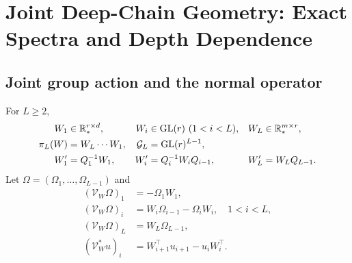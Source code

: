 \section{Joint Deep-Chain Geometry: Exact Spectra and Depth Dependence}
\label{app:rigid-chain}
\subsection{Joint group action and the normal operator}
\begin{definition}
For $L\geq2$,
\begin{align}
W_1&\in\mathbb R_*^{r\times d},&
W_i&\in{\rm GL}(r)\ (1<i<L),&
W_L&\in\mathbb R_*^{m\times r},\\
\pi_L(W)&=W_L\cdots W_1,&
\mathcal G_L&={\rm GL}(r)^{L-1},\\
W_1'&=Q_1^{-1}W_1,&
W_i'&=Q_i^{-1}W_iQ_{i-1},&
W_L'&=W_LQ_{L-1}.
\end{align}
Let $\Omega=(\Omega_1,\ldots,\Omega_{L-1})$ and
\begin{align}
(\mathcal V_W\Omega)_1&=-\Omega_1W_1,\\
(\mathcal V_W\Omega)_i&=W_i\Omega_{i-1}-\Omega_iW_i,\quad1<i<L,\\
(\mathcal V_W\Omega)_L&=W_L\Omega_{L-1},\\
(\mathcal V_W^*u)_i&=W_{i+1}^\top u_{i+1}-u_iW_i^\top .
\label{eq:rigid-chain-vertical}
\end{align}
\end{definition}


